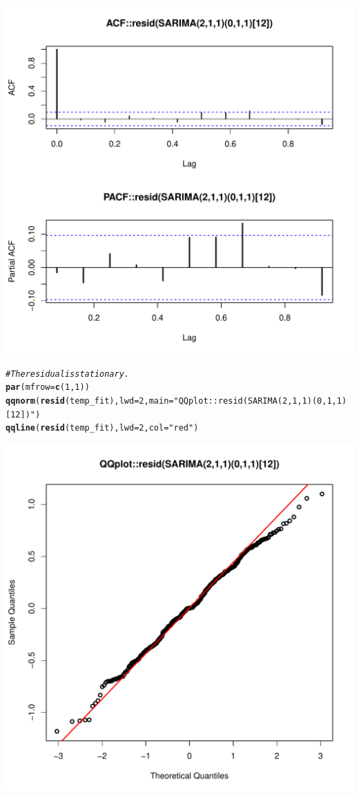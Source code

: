 \documentclass[10pt]{article}\usepackage[]{graphicx}\usepackage[]{color}
\makeatletter
\def\maxwidth{ %
  \ifdim\Gin@nat@width>\linewidth
    \linewidth
  \else
    \Gin@nat@width
  \fi
}
\newcommand{\hlnum}[1]{\textcolor[rgb]{0.686,0.059,0.569}{#1}}%
\newcommand{\hlstr}[1]{\textcolor[rgb]{0.192,0.494,0.8}{#1}}%
\newcommand{\hlcom}[1]{\textcolor[rgb]{0.678,0.584,0.686}{\textit{#1}}}%
\newcommand{\hlstd}[1]{\textcolor[rgb]{0.345,0.345,0.345}{#1}}%
\newcommand{\hlkwc}[1]{\textcolor[rgb]{0.333,0.667,0.333}{#1}}%
\newcommand{\hlkwd}[1]{\textcolor[rgb]{0.737,0.353,0.396}{\textbf{#1}}}%
\newenvironment{kframe}{%
 \def\at@end@of@kframe{}%
 \ifinner\ifhmode%
  \def\at@end@of@kframe{\end{minipage}}%
  \begin{minipage}{\columnwidth}%
 \fi\fi%
 \def\FrameCommand##1{\hskip\@totalleftmargin \hskip-\fboxsep
 \colorbox{shadecolor}{##1}\hskip-\fboxsep
     \hskip-\linewidth \hskip-\@totalleftmargin \hskip\columnwidth}%
 \MakeFramed {\advance\hsize-\width
   \@totalleftmargin\z@ \linewidth\hsize
   \@setminipage}}%
 {\par\unskip\endMakeFramed%
 \at@end@of@kframe}
\newenvironment{knitrout}{}{} %
\makeatother
\begin{document}
\begin{knitrout}
\begin{kframe}
\end{kframe}
\includegraphics[width=\maxwidth]{figure/unnamed-chunk-28-2} 
\begin{kframe}\begin{alltt}
\hlcom{#The residual is stationary.}
\hlkwd{par}\hlstd{(}\hlkwc{mfrow}\hlstd{=}\hlkwd{c}\hlstd{(}\hlnum{1}\hlstd{,}\hlnum{1}\hlstd{))}
\hlkwd{qqnorm}\hlstd{(}\hlkwd{resid}\hlstd{(temp_fit),}\hlkwc{lwd}\hlstd{=}\hlnum{2}\hlstd{,} \hlkwc{main}\hlstd{=}\hlstr{"QQplot::resid(SARIMA(2,1,1)(0,1,1)[12])"}\hlstd{)}
\hlkwd{qqline}\hlstd{(}\hlkwd{resid}\hlstd{(temp_fit),} \hlkwc{lwd}\hlstd{=}\hlnum{2}\hlstd{,} \hlkwc{col}\hlstd{=}\hlstr{"red"}\hlstd{)}
\end{alltt}
\end{kframe}
\includegraphics[width=\maxwidth]{figure/unnamed-chunk-28-3} 

\end{knitrout}
\end{document}
